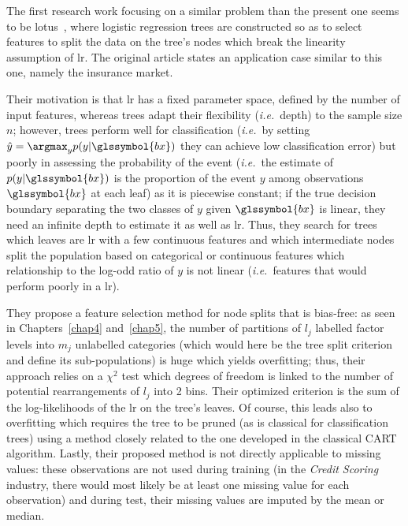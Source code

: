 The first research work focusing on a similar problem than the present one seems to be \gls{lotus}~\cite{chan2004lotus}, where logistic regression trees are constructed so as to select features to split the data on the tree's nodes which break the linearity assumption of \gls{lr}. The original article states an application case similar to this one, namely the insurance market.

Their motivation is that \gls{lr} has a fixed parameter space, defined by the number of input features, whereas trees adapt their flexibility (\textit{i.e.}\ depth) to the sample size $n$; however, trees perform well for classification (\textit{i.e.}\ by setting $\hat{y} = \argmax_y p(y | \glssymbol{bx})$ they can achieve low classification error) but poorly in assessing the probability of the event (\textit{i.e.}\ the estimate of $p(y | \glssymbol{bx})$ is the proportion of the event $y$ among observations $\glssymbol{bx}$ at each leaf) as it is piecewise constant; if the true decision boundary separating the two classes of $y$ given $\glssymbol{bx}$ is linear, they need an infinite depth to estimate it as well as \gls{lr}. Thus, they search for trees which leaves are \gls{lr} with a few continuous features and which intermediate nodes split the population based on categorical or continuous features which relationship to the log-odd ratio of $y$ is not linear (\textit{i.e.}\ features that would perform poorly in a \gls{lr}).

They propose a feature selection method for node splits that is bias-free: as seen in Chapters~\ref{chap4} and~\ref{chap5}, the number of partitions of $l_j$ labelled factor levels into $m_j$ unlabelled categories (which would here be the tree split criterion and define its sub-populations) is huge which yields overfitting; thus, their approach relies on a $\chi^2$ test which degrees of freedom is linked to the number of potential rearrangements of $l_j$ into 2 bins. Their optimized criterion is the sum of the log-likelihoods of the \gls{lr} on the tree's leaves. Of course, this leads also to overfitting which requires the tree to be pruned (as is classical for classification trees) using a method closely related to the one developed in the classical CART~\cite{cart84} algorithm. Lastly, their proposed method is not directly applicable to missing values: these observations are not used during training (in the \textit{Credit Scoring} industry, there would most likely be at least one missing value for each observation) and during test, their missing values are imputed by the mean or median.

